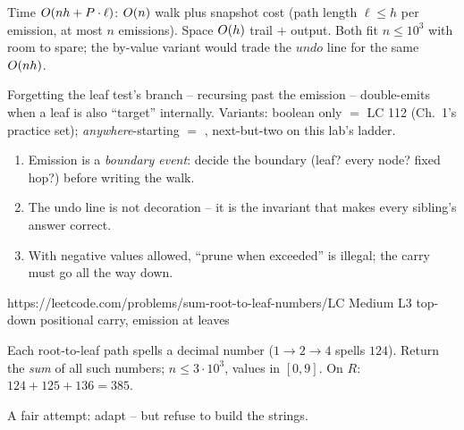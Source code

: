 \begin{complexitybox}
Time $O(nh + P\cdot \ell)$: $O(n)$ walk plus snapshot cost (path length
$\ell \le h$ per emission, at most $n$ emissions). Space $O(h)$ trail $+$
output. Both fit $n\le10^{3}$ with room to spare; the by-value variant would
trade the $\mathit{undo}$ line for the same $O(nh)$.
\end{complexitybox}

\begin{warningbox}
Forgetting the leaf test's  branch -- recursing past the emission --
double-emits when a leaf is also ``target'' internally. Variants: boolean only
$=$ LC 112 (Ch.~1's practice set); \emph{anywhere}-starting
$=$ , next-but-two on this lab's ladder.
\end{warningbox}

\begin{insightbox}
\begin{enumerate}[nosep, leftmargin=1.6em]
  \item Emission is a \emph{boundary event}: decide the boundary (leaf? every
        node? fixed hop?) before writing the walk.
  \item The undo line is not decoration -- it is the invariant that makes every
        sibling's answer correct.
  \item With negative values allowed, ``prune when exceeded'' is illegal; the
        carry must go all the way down.
\end{enumerate}
\end{insightbox}

  {https://leetcode.com/problems/sum-root-to-leaf-numbers/}{LC Medium L3}
  {top-down positional carry, emission at leaves}

\begin{problemstatement}
Each root-to-leaf path spells a decimal number ($1\to2\to4$ spells $124$).
Return the \emph{sum} of all such numbers; $n \le 3 \cdot 10^3$, values in
$[0,9]$. On $R$: $124 + 125 + 136 = 385$.
\end{problemstatement}

\begin{attemptgate}
A fair attempt: adapt  -- but refuse to build the strings.
\end{attemptgate}

